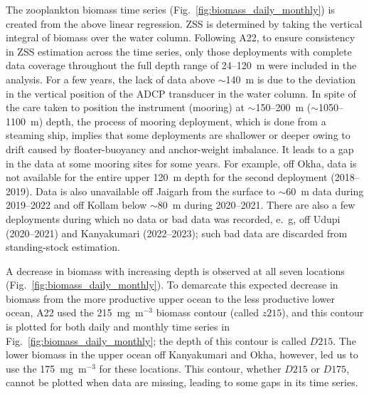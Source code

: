 \documentclass[authoryear,review,11pt]{elsarticle}
\begin{document}

The zooplankton biomass time series (Fig.~\ref{fig:biomass_daily_monthly}) is created from the above linear regression. ZSS is determined by taking the vertical integral of biomass over the water column. Following A22, to ensure consistency in ZSS estimation across the time series, only those deployments with complete data coverage throughout the full depth range of 24--120~m were included in the analysis. For a few years, the lack of data above $\sim$140~m is due to the deviation in the vertical position of the ADCP transducer in the water column. In spite of the care taken to position the instrument (mooring) at  $\sim$150--200~m ($\sim$1050--1100~m) depth, the process of mooring deployment, which is done from a steaming ship, implies that some deployments are shallower or deeper owing to drift caused by floater-buoyancy and anchor-weight imbalance. It leads to a gap in the data at some mooring sites for some years. For example, off Okha, data is not available for the entire upper 120~m depth for the second deployment (2018--2019). Data is also unavailable off Jaigarh from the surface to $\sim$60~m data during 2019--2022 and off Kollam below $\sim$80~m during 2020--2021. There are also a few deployments during which no data or bad data was recorded, e.~g, off Udupi (2020--2021) and Kanyakumari (2022--2023); such bad data are discarded from standing-stock estimation. 	

A decrease in biomass with increasing depth is observed at all seven locations (Fig.~\ref{fig:biomass_daily_monthly}).  To demarcate this expected decrease in biomass from the more productive upper ocean to the less productive lower ocean, A22 used the 215~mg~m$^{-3}$ biomass contour (called $z215$), and this contour is plotted for both daily and monthly time series in Fig.~\ref{fig:biomass_daily_monthly}; the depth of this contour is called $D215$.  The lower biomass in the upper ocean off Kanyakumari and Okha, however, led us to use the 175~mg~m$^{-3}$ for these locations.  This contour, whether $D215$ or $D175$, cannot be plotted when data are missing, leading to some gaps in its time series.  

\end{document}
